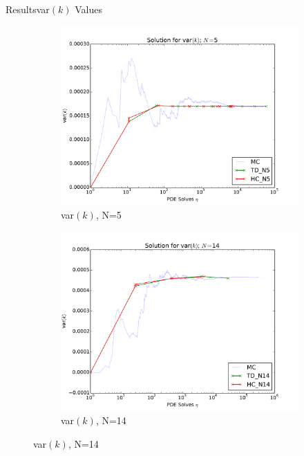 \documentclass{beamer}
\begin{document}
\begin{frame}{Results}{var$(k)$ Values}
  \begin{figure}[h!]
    \centering
    \begin{subfigure}[b]{0.49 \textwidth}
      \includegraphics[width=\textwidth]{../graphics/N5_iso_var_vals}
      \caption{var$(k)$, N=5}
      \label{vsoln_5}
    \end{subfigure}
    \begin{subfigure}[b]{0.49 \textwidth}
      \includegraphics[width=\textwidth]{../graphics/N14_iso_var_vals}
      \caption{var$(k)$, N=14}
      \label{vsoln_14}
    \end{subfigure}
  \end{figure}
\end{frame}
\end{document}
